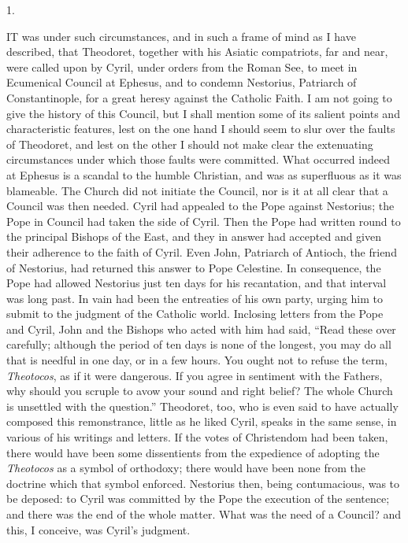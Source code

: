 
1.

IT was under such circumstances, and in such
a frame of mind as I have described, that Theodoret, together with his
Asiatic compatriots, far and near, were called upon by Cyril, under
orders from the Roman See, to meet in Ecumenical Council at Ephesus,
and to condemn Nestorius, Patriarch of Constantinople, for a great
heresy against the Catholic Faith. I am not going to give the history
of this Council, but I shall mention some of its salient points and
characteristic features, lest on the one hand I should seem to slur
over the faults of Theodoret, and lest on the other I should not make
clear the extenuating circumstances under which those faults were
committed. What occurred indeed at Ephesus is a scandal to the humble
Christian, and was as superfluous as it was blameable. The Church did
not initiate the Council, nor is it at all clear that a Council was
then needed. Cyril had appealed to the Pope against Nestorius; the
Pope in Council had taken the side of Cyril. Then the Pope had written
round to the principal Bishops of the East, and they in answer had
accepted and given their adherence to the faith of Cyril. Even John,
Patriarch of Antioch, the friend of Nestorius, had returned this
answer to Pope Celestine. In consequence, the Pope had allowed
Nestorius just ten days for his recantation, and that interval was
long past. In vain had been the entreaties of his own party, urging
him to submit to the judgment of the Catholic world. Inclosing letters
from the Pope and Cyril, John and the Bishops who acted with him
had said, ``Read these over carefully; although the period of ten
days is none of the longest, you may do all that is needful in one
day, or in a few hours. You ought not to refuse the term, \emph{Theotocos},
as if it were dangerous. If you agree in sentiment with the Fathers,
why should you scruple to avow your sound and right belief? The whole
Church is unsettled with the question.'' Theodoret, too, who is
even said to have actually composed this remonstrance, little as he
liked Cyril, speaks in the same sense, in various of his writings and
letters. If the votes of Christendom had been taken, there would have
been some dissentients from the expedience of adopting the \emph{Theotocos}
as a symbol of orthodoxy; there would have been none from the doctrine
which that symbol enforced. Nestorius then, being contumacious, was to
be deposed: to Cyril was committed by the Pope the execution of the
sentence; and there was the end of the whole matter. What was the need
of a Council? and this, I conceive, was Cyril's judgment.

